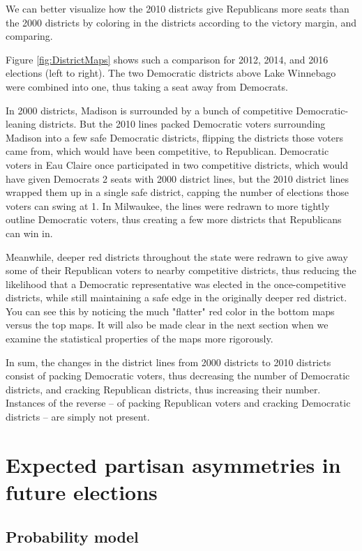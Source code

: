 \documentclass[preprint,12pt]{article}
\begin{document}
We can better visualize how the 2010 districts give Republicans more seats than the 2000 districts by coloring in the districts according to the victory margin, and comparing.

Figure \ref{fig:DistrictMaps} shows such a comparison for 2012, 2014, and 2016 elections (left to right).
The two Democratic districts above Lake Winnebago were combined into one, thus taking a seat away from Democrats.

In 2000 districts, Madison is surrounded by a bunch of competitive Democratic-leaning districts.
But the 2010 lines packed Democratic voters surrounding Madison into a few safe Democratic districts, flipping the districts those voters came from, which would have been competitive, to Republican.
Democratic voters in Eau Claire once participated in two competitive districts, which would have given Democrats 2 seats with 2000 district lines, but the 2010 district lines wrapped them up in a single safe district, capping the number of elections those voters can swing at 1.
In Milwaukee, the lines were redrawn to more tightly outline Democratic voters, thus creating a few more districts that Republicans can win in.

Meanwhile, deeper red districts throughout the state were redrawn to give away some of their Republican voters to nearby competitive districts,
thus reducing the likelihood that a Democratic representative was elected in the once-competitive districts,
while still maintaining a safe edge in the originally deeper red district.  
You can see this by noticing the much "flatter" red color in the bottom maps versus the top maps.
It will also be made clear in the next section when we examine the statistical properties of the maps more rigorously.

In sum, the changes in the district lines from 2000 districts to 2010 districts consist of packing Democratic voters, thus decreasing the number of Democratic districts, and cracking Republican districts, thus increasing their number.
Instances of the reverse -- of packing Republican voters and cracking Democratic districts -- are simply not present.

\section{Expected  partisan asymmetries in future elections}

\subsection{Probability model}
\end{document}
